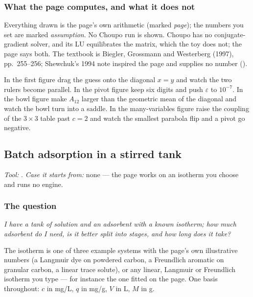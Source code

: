 \documentclass[11pt,a4paper]{article}
\begin{document}
\subsubsection*{What the page computes, and what it does not}

Everything drawn is the page's own arithmetic (marked \emph{page}); the numbers
you set are marked \emph{assumption}.  No Choupo run is shown.  Choupo has no
conjugate-gradient solver, and its LU equilibrates the matrix, which the toy does
not; the page says both.  The textbook is Biegler, Grossmann and Westerberg
(1997), pp.~255--256; Shewchuk's 1994 note inspired the page and supplies no number
().

\begin{tryit}
In the first figure drag the guess onto the diagonal $x=y$ and watch the two
rulers become parallel.  In the pivot figure keep six digits and push
$\varepsilon$ to $10^{-7}$.  In the bowl figure make $A_{12}$ larger than the
geometric mean of the diagonal and watch the bowl turn into a saddle.  In the
many-variables figure raise the coupling of the $3\times3$ table past $c=2$ and
watch the smallest parabola flip and a pivot go negative.
\end{tryit}

\subsection{Batch adsorption in a stirred tank}\label{sec:edu-batch-adsorption}


\noindent\textit{\small Tool:} .
\textit{\small Case it starts from:} none --- the page works on an isotherm
you choose and runs no engine.

\subsubsection*{The question}

\emph{I have a tank of solution and an adsorbent with a known isotherm; how
much adsorbent do I need, is it better split into stages, and how long does
it take?}

The isotherm is one of three example systems with the page's own
illustrative numbers (a Langmuir dye on powdered carbon, a Freundlich
aromatic on granular carbon, a linear trace solute), or any linear, Langmuir
or Freundlich isotherm you type --- for instance the one fitted on the
 page.  One basis throughout: $c$ in mg/L, $q$ in
mg/g, $V$ in L, $M$ in g.
\end{document}
